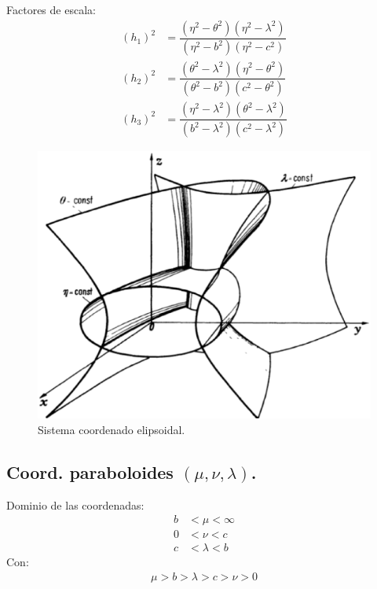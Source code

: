 Factores de escala:
\begin{align*}
(h_{1})^{2} &= \dfrac{(\eta^{2} - \theta^{2})(\eta^{2} - \lambda^{2})}{(\eta^{2} - b^{2})(\eta^{2} - c^{2})} \\[0.5em]
(h_{2})^{2} &= \dfrac{(\theta^{2} - \lambda^{2})(\eta^{2} - \theta^{2})}{(\theta^{2} - b^{2})(c^{2} - \theta^{2})} \\[0.5em]
(h_{3})^{2} &= \dfrac{(\eta^{2} - \lambda^{2})(\theta^{2} - \lambda^{2})}{(b^{2} -  \lambda^{2})(c^{2} - \lambda^{2})}
\end{align*}

\begin{figure}[H]
    \centering
    \includegraphics[scale=0.5]{Imagenes/Sistema_Elipsoidal.eps}
    \caption{Sistema coordenado elipsoidal.}
\end{figure}

\subsection{Coord. paraboloides \texorpdfstring{$(\mu, \nu, \lambda)$}{(m, n, l)}.}

Dominio de las coordenadas:
\begin{align*}
b &< \mu < \infty \\
0 &< \nu < c \\
c &< \lambda < b
\end{align*}
Con:
\begin{align*}
\mu > b > \lambda > c > \nu > 0
\end{align*}

